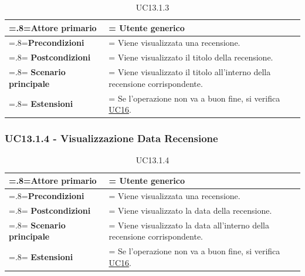             \begin{table}[H]
                \centering
                \renewcommand{\arraystretch}{1.8}
                \renewcommand\tabularxcolumn[1]{m{#1}}
                \begin{tabularx}{0.9\textwidth} {
                    >{\hsize=.8\hsize\linewidth=\hsize}X
                    >{\hsize=1.2\hsize\linewidth=\hsize}X}
                    \hline
                    \textbf{Attore primario} & Utente generico \\
                    \hline
                    \textbf{Precondizioni} & Viene visualizzata una recensione. \\
                    \hline
                    \textbf{Postcondizioni} & Viene visualizzato il titolo della recensione. \\
                    \hline
                    \textbf{Scenario principale} & Viene visualizzato il titolo all'interno della recensione corrispondente. \\
                    \hline
                    \textbf{Estensioni} & Se l'operazione non va a buon fine, si verifica \hyperref[UC16]{UC16}. \\
                    \hline
                \end{tabularx}
                \caption{UC13.1.3}
            \end{table}

        \subsubsection{UC13.1.4 - Visualizzazione Data Recensione}
        \label{UC13.1.4}

            \begin{table}[H]
                \centering
                \renewcommand{\arraystretch}{1.8}
                \renewcommand\tabularxcolumn[1]{m{#1}}
                \begin{tabularx}{0.9\textwidth} {
                    >{\hsize=.8\hsize\linewidth=\hsize}X
                    >{\hsize=1.2\hsize\linewidth=\hsize}X}
                    \hline
                    \textbf{Attore primario} & Utente generico \\
                    \hline
                    \textbf{Precondizioni} & Viene visualizzata una recensione. \\
                    \hline
                    \textbf{Postcondizioni} & Viene visualizzato la data della recensione. \\
                    \hline
                    \textbf{Scenario principale} & Viene visualizzato la data all'interno della recensione corrispondente. \\
                    \hline
                    \textbf{Estensioni} & Se l'operazione non va a buon fine, si verifica \hyperref[UC16]{UC16}. \\
                    \hline
                \end{tabularx}
                \caption{UC13.1.4}
            \end{table}

